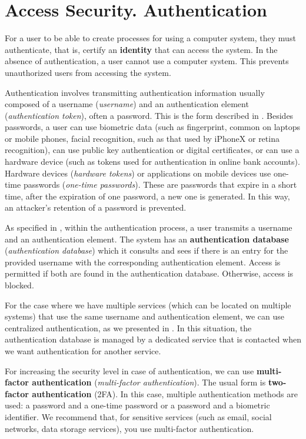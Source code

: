
\section{Access Security.
Authentication}
\label{sec:sec:auth}

For a user to be able to create processes for using a computer system, they must authenticate, that is, certify an \textbf{identity} that can access the system.
In the absence of authentication, a user cannot use a computer system.
This prevents unauthorized users from accessing the system.

Authentication involves transmitting authentication information usually composed of a username (\textit{username}) and an authentication element (\textit{authentication token}), often a password.
This is the form described in .
Besides passwords, a user can use biometric data (such as fingerprint, common on laptops or mobile phones, facial recognition, such as that used by iPhoneX or retina recognition), can use public key authentication or digital certificates, or can use a hardware device (such as tokens used for authentication in online bank accounts).
Hardware devices (\textit{hardware tokens}) or applications on mobile devices use one-time passwords (\textit{one-time passwords}).
These are passwords that expire in a short time, after the expiration of one password, a new one is generated.
In this way, an attacker's retention of a password is prevented.

As specified in , within the authentication process, a user transmits a username and an authentication element.
The system has an \textbf{authentication database} (\textit{authentication database}) which it consults and sees if there is an entry for the provided username with the corresponding authentication element.
Access is permitted if both are found in the authentication database.
Otherwise, access is blocked.

For the case where we have multiple services (which can be located on multiple systems) that use the same username and authentication element, we can use centralized authentication, as we presented in .
In this situation, the authentication database is managed by a dedicated service that is contacted when we want authentication for another service.

For increasing the security level in case of authentication, we can use \textbf{multi-factor authentication} (\textit{multi-factor authentication}).
The usual form is \textbf{two-factor authentication} (2FA).
In this case, multiple authentication methods are used: a password and a one-time password or a password and a biometric identifier.
We recommend that, for sensitive services (such as email, social networks, data storage services), you use multi-factor authentication.

